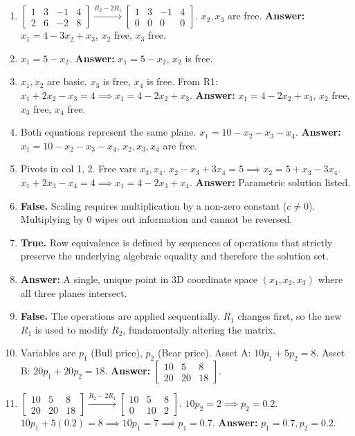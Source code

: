 \documentclass[11pt]{article}
\begin{document}
\begin{enumerate}[label=\textbf{Sol 1.1.\arabic*}]
    \item $\left[\begin{array}{ccc|c} 1 & 3 & -1 & 4 \\ 2 & 6 & -2 & 8 \end{array}\right] \xrightarrow{R_2-2R_1} \left[\begin{array}{ccc|c} 1 & 3 & -1 & 4 \\ 0 & 0 & 0 & 0 \end{array}\right]$. $x_2, x_3$ are free. \textbf{Answer:} $x_1 = 4 - 3x_2 + x_3$, $x_2$ free, $x_3$ free.
    \item $x_1 = 5 - x_2$. \textbf{Answer:} $x_1 = 5 - x_2$, $x_2$ is free.
    \item $x_1, x_2$ are basic. $x_3$ is free, $x_4$ is free. From R1: $x_1 + 2x_2 - x_3 = 4 \implies x_1 = 4 - 2x_2 + x_3$. \textbf{Answer:} $x_1 = 4 - 2x_2 + x_3$, $x_2$ free, $x_3$ free, $x_4$ free.
    \item Both equations represent the same plane. $x_1 = 10 - x_2 - x_3 - x_4$. \textbf{Answer:} $x_1 = 10 - x_2 - x_3 - x_4$, $x_2, x_3, x_4$ are free.
    \item Pivots in col 1, 2. Free vars $x_3, x_4$. $x_2 - x_3 + 3x_4 = 5 \implies x_2 = 5 + x_3 - 3x_4$. $x_1 + 2x_3 - x_4 = 4 \implies x_1 = 4 - 2x_3 + x_4$. \textbf{Answer:} Parametric solution listed.
    \item \textbf{False.} Scaling requires multiplication by a non-zero constant ($c \neq 0$). Multiplying by 0 wipes out information and cannot be reversed.
    \item \textbf{True.} Row equivalence is defined by sequences of operations that strictly preserve the underlying algebraic equality and therefore the solution set.
    \item \textbf{Answer:} A single, unique point in 3D coordinate space $(x_1, x_2, x_3)$ where all three planes intersect.
    \item \textbf{False.} The operations are applied sequentially. $R_1$ changes first, so the new $R_1$ is used to modify $R_2$, fundamentally altering the matrix.
    \item Variables are $p_1$ (Bull price), $p_2$ (Bear price). Asset A: $10p_1 + 5p_2 = 8$. Asset B: $20p_1 + 20p_2 = 18$. \textbf{Answer:} $\left[\begin{array}{cc|c} 10 & 5 & 8 \\ 20 & 20 & 18 \end{array}\right]$.
    \item $\left[\begin{array}{cc|c} 10 & 5 & 8 \\ 20 & 20 & 18 \end{array}\right] \xrightarrow{R_2-2R_1} \left[\begin{array}{cc|c} 10 & 5 & 8 \\ 0 & 10 & 2 \end{array}\right]$. $10p_2 = 2 \implies p_2 = 0.2$. $10p_1 + 5(0.2) = 8 \implies 10p_1 = 7 \implies p_1 = 0.7$. \textbf{Answer:} $p_1 = 0.7, p_2 = 0.2$.

\end{enumerate}
\end{document}

